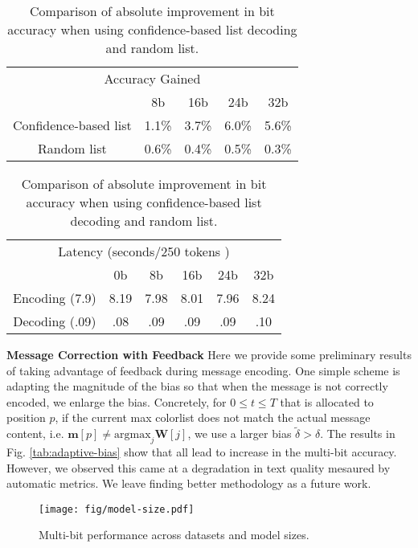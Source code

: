 \begin{table}
\centering
\begin{tabular}{c|cccc}
    \toprule

    \multicolumn{5}{c}{Accuracy Gained} \\ 
    &  8b &  16b  &  24b & 32b \\
    \toprule
    Confidence-based list & 1.1\%  &  3.7\%  & 6.0\% & 5.6\%  \\  
    Random list & 0.6\% & 0.4\% & 0.5\% &  0.3\% \\
    \bottomrule
\end{tabular}
\begin{tabular}{c|ccccc}
    \multicolumn{6}{c}{Latency (seconds$\slash$250 tokens )} \\
    & 0b & 8b &  16b  &  24b & 32b \\
    \toprule 
    Encoding (7.9) & 8.19 & 7.98 & 8.01 & 7.96 & 8.24  \\
    Decoding (.09) & .08 & .09 & .09 & .09 & .10 \\
    \bottomrule
\end{tabular}
\caption{Comparison of absolute improvement in bit accuracy when using confidence-based list decoding and random list.}\label{tab:mic}
\end{table}



\noindent \textbf{Message Correction with Feedback}
Here we provide some preliminary results of taking advantage of feedback during message encoding. One simple scheme is adapting the magnitude of the bias so that when the message is not correctly encoded, we enlarge the bias. Concretely, for $0 \leq t \leq T$ that is allocated to position $p$, if the current max colorlist does not match the actual message content, i.e. $\mathbf{m}[p] \neq \text{argmax}_j \mathbf{W}[j]$, we use a larger bias $\tilde \delta > \delta$. The results in Fig. \ref{tab:adaptive-bias} show that all lead to increase in the multi-bit accuracy. However, we observed this came at a degradation in text quality mesaured by automatic metrics. We leave finding better methodology as a future work. 


\begin{figure}
    \centering
    \texttt{[image: fig/model-size.pdf]}
    \caption{Multi-bit performance across datasets and model sizes.}
    \label{fig:model-dataset-ablation}
\end{figure}




